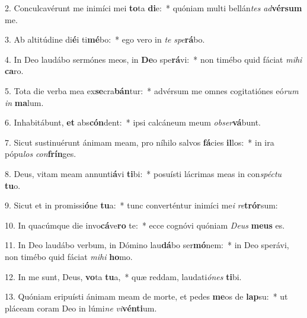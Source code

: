 2. Conculcavérunt me inimíci mei \textbf{to}ta \textbf{di}e:~*  quóniam multi bellán\textit{tes} \textit{ad}\textbf{vér}\textbf{sum} me.\

3. Ab altitúdine di\textbf{é}i ti\textbf{mé}bo:~*  ego vero in \textit{te} \textit{spe}\textbf{rá}bo.\

4. In Deo laudábo sermónes meos, in \textbf{De}o spe\textbf{rá}vi:~*  non timébo quid fáciat \textit{mi}\textit{hi} \textbf{ca}ro.\

5. Tota die verba mea ex\textbf{se}cra\textbf{bán}tur:~*  advérsum me omnes cogitatiónes eó\textit{rum} \textit{in} \textbf{ma}lum.\

6. Inhabitábunt, \textbf{et} abs\textbf{cón}dent:~*  ipsi calcáneum meum \textit{ob}\textit{ser}\textbf{vá}bunt.\

7. Sicut sustinuérunt ánimam meam, pro níhilo salvos \textbf{fá}cies \textbf{il}los:~*  in ira pópu\textit{los} \textit{con}\textbf{frín}ges.\

8. Deus, vitam meam annunti\textbf{á}vi \textbf{ti}bi:~*  posuísti lácrimas meas in con\textit{spéc}\textit{tu} \textbf{tu}o.\

9. Sicut et in promissi\textbf{ó}ne \textbf{tu}a:~*  tunc converténtur inimíci me\textit{i} \textit{re}\textbf{trór}sum:\

10. In quacúmque die invo\textbf{cá}ve\textbf{ro} te:~*  ecce cognóvi quóniam \textit{De}\textit{us} \textbf{me}\textbf{us} es.\

11. In Deo laudábo verbum, in Dómino lau\textbf{dá}bo ser\textbf{mó}nem:~*  in Deo sperávi, non timébo quid fáciat \textit{mi}\textit{hi} \textbf{ho}mo.\

12. In me sunt, Deus, \textbf{vo}ta \textbf{tu}a,~*  quæ reddam, laudati\textit{ó}\textit{nes} \textbf{ti}bi.\

13. Quóniam eripuísti ánimam meam de morte, et pedes \textbf{me}os de \textbf{lap}su:~*  ut pláceam coram Deo in lúmi\textit{ne} \textit{vi}\textbf{vén}\textbf{ti}um.\

